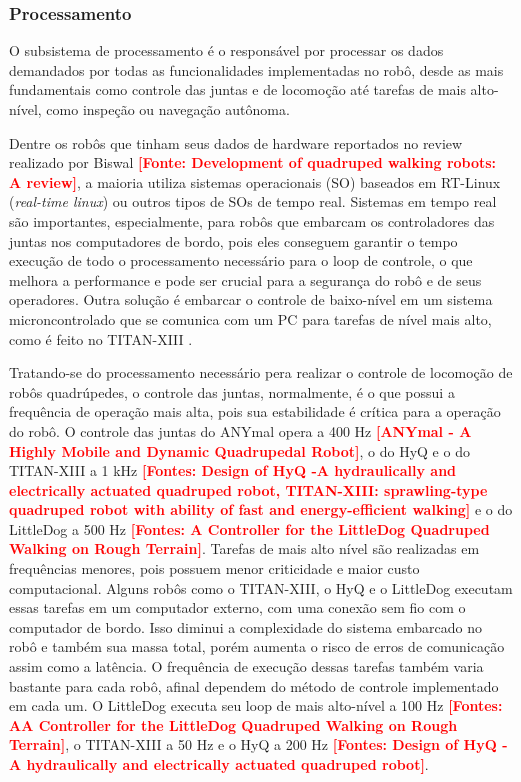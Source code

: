 \documentclass[../main.tex]{subfiles}
\begin{document}
  \subsubsection{Processamento}
  O subsistema de processamento é o responsável por processar os dados demandados por todas as funcionalidades implementadas no robô, desde as mais fundamentais como controle das juntas e de locomoção até tarefas de mais alto-nível, como inspeção ou navegação autônoma.

  Dentre os robôs que tinham seus dados de hardware reportados no review realizado por Biswal \textbf{\textcolor{red}{[Fonte: Development of quadruped walking robots: A review]}}, a maioria utiliza sistemas operacionais (SO) baseados em RT-Linux (\textit{real-time linux}) ou outros tipos de SOs de tempo real. Sistemas em tempo real são importantes, especialmente, para robôs que embarcam os controladores das juntas nos computadores de bordo, pois eles conseguem garantir o tempo execução de todo o processamento necessário para o loop de controle, o que melhora a performance e pode ser crucial para a segurança do robô e de seus operadores. Outra solução é embarcar o controle de baixo-nível em um sistema microncontrolado que se comunica com um PC para tarefas de nível mais alto, como é feito no TITAN-XIII \cite{Kitano2016}.

  Tratando-se do processamento necessário pera realizar o controle de locomoção de robôs quadrúpedes, o controle das juntas, normalmente, é o que possui a frequência de operação mais alta, pois sua estabilidade é crítica para a operação do robô. O controle das juntas do ANYmal opera a 400 Hz \textbf{\textcolor{red}{[ANYmal - A Highly Mobile and Dynamic Quadrupedal Robot]}}, o do HyQ e o do TITAN-XIII a 1 kHz \textbf{\textcolor{red}{[Fontes: Design of HyQ -A hydraulically and electrically actuated quadruped robot, TITAN-XIII: sprawling-type quadruped robot with ability of fast and energy-efficient walking]}} e o do LittleDog a 500 Hz \textbf{\textcolor{red}{[Fontes: A Controller for the LittleDog Quadruped Walking on Rough Terrain]}}. Tarefas de mais alto nível são realizadas em frequências menores, pois possuem menor criticidade e maior custo computacional. Alguns robôs como o TITAN-XIII, o HyQ e o LittleDog executam essas tarefas em um computador externo, com uma conexão sem fio com o computador de bordo. Isso diminui a complexidade do sistema embarcado no robô e também sua massa total, porém aumenta o risco de erros de comunicação assim como a latência. O frequência de execução dessas tarefas também varia bastante para cada robô, afinal dependem do método de controle implementado em cada um. O LittleDog executa seu loop de mais alto-nível a 100 Hz \textbf{\textcolor{red}{[Fontes: AA Controller for the LittleDog Quadruped Walking on Rough Terrain]}}, o TITAN-XIII a 50 Hz \cite{Kitano2016} e o HyQ a 200 Hz \textbf{\textcolor{red}{[Fontes: Design of HyQ -A hydraulically and electrically actuated quadruped robot]}}.
\end{document}
